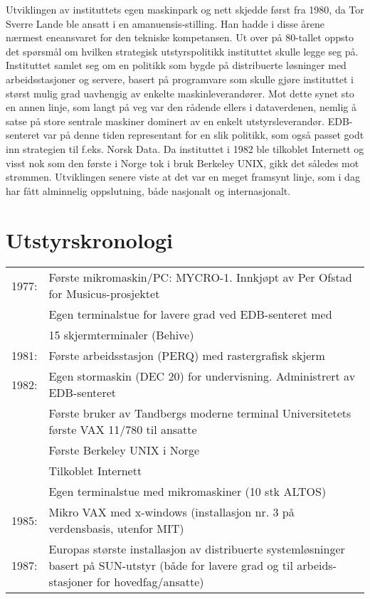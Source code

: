 \documentclass[../../main.tex]{subfiles}
\begin{document}
Utviklingen av instituttets egen maskinpark og nett skjedde først fra 1980, da Tor Sverre Lande ble ansatt i en amanuensis-stilling. Han hadde i disse årene nærmest eneansvaret for den tekniske kompetansen. Ut over på 80-tallet oppsto det spørsmål om hvilken strategisk utstyrspolitikk instituttet skulle legge seg på. Instituttet samlet seg om en politikk som bygde på distribuerte løsninger med arbeidsstasjoner og servere, basert på programvare som skulle gjøre instituttet i størst mulig grad uavhengig av enkelte maskinleverandører. Mot dette synet sto en annen linje, som langt på veg var den rådende ellers i dataverdenen, nemlig å satse på store sentrale maskiner dominert av en enkelt utstyrsleverandør. EDB-senteret var på denne tiden representant for en slik politikk, som også passet godt inn strategien til f.eks. Norsk Data. Da instituttet i 1982 ble tilkoblet Internett og visst nok som den første i Norge tok i bruk Berkeley UNIX, gikk det således mot strømmen. Utviklingen senere viste at det var en meget framsynt linje, som i dag har fått alminnelig oppslutning, både nasjonalt og internasjonalt.

\section{Utstyrskronologi}

\begin{table}[]
	\begin{tabular}{ll}
		1977: & Første mikromaskin/PC: MYCRO-1. Innkjøpt av Per Ofstad for Musicus-prosjektet \\
		& Egen terminalstue for lavere grad ved EDB-senteret med \\
		& 15 skjermterminaler (Behive) \\
		1981: & Første arbeidsstasjon (PERQ) med rastergrafisk skjerm \\
		1982: & Egen stormaskin (DEC 20) for undervisning. Administrert av EDB-senteret \\
		& Første bruker av Tandbergs moderne terminal Universitetets første VAX 11/780 til ansatte \\
		& Første Berkeley UNIX i Norge \\
		& Tilkoblet Internett \\
		& Egen terminalstue med mikromaskiner (10 stk ALTOS) \\
		1985: & Mikro VAX med x-windows (installasjon nr. 3 på verdensbasis, utenfor MIT) \\
		1987: & Europas største installasjon av distribuerte systemløsninger basert på SUN-utstyr (både for lavere grad og til arbeids- stasjoner for hovedfag/ansatte) \\
	\end{tabular}
\end{table}
\end{document}
